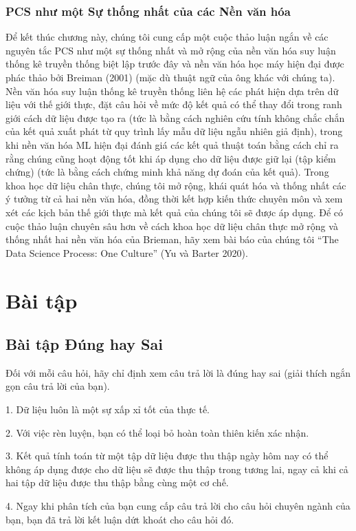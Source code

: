 \subsubsection{PCS như một Sự thống nhất của các Nền văn hóa}
Để kết thúc chương này, chúng tôi cung cấp một cuộc thảo luận ngắn về các nguyên tắc PCS như một sự thống nhất và mở rộng của nền văn hóa suy luận thống kê truyền thống biệt lập trước đây và nền văn hóa học máy hiện đại được phác thảo bởi Breiman (2001) (mặc dù thuật ngữ của ông khác với chúng ta). Nền văn hóa suy luận thống kê truyền thống liên hệ các phát hiện dựa trên dữ liệu với thế giới thực, đặt câu hỏi về mức độ kết quả có thể thay đổi trong ranh giới cách dữ liệu được tạo ra (tức là bằng cách nghiên cứu tính không chắc chắn của kết quả xuất phát từ quy trình lấy mẫu dữ liệu ngẫu nhiên giả định), trong khi nền văn hóa ML hiện đại đánh giá các kết quả thuật toán bằng cách chỉ ra rằng chúng cũng hoạt động tốt khi áp dụng cho dữ liệu được giữ lại (tập kiểm chứng) (tức là bằng cách chứng minh khả năng dự đoán của kết quả). Trong khoa học dữ liệu chân thực, chúng tôi mở rộng, khái quát hóa và thống nhất các ý tưởng từ cả hai nền văn hóa, đồng thời kết hợp kiến thức chuyên môn và xem xét các kịch bản thế giới thực mà kết quả của chúng tôi sẽ được áp dụng. Để có cuộc thảo luận chuyên sâu hơn về cách khoa học dữ liệu chân thực mở rộng và thống nhất hai nền văn hóa của Brieman, hãy xem bài báo của chúng tôi “The Data Science Process: One Culture” (Yu và Barter 2020).

\section*{Bài tập}

\subsection*{Bài tập Đúng hay Sai}
Đối với mỗi câu hỏi, hãy chỉ định xem câu trả lời là đúng hay sai (giải thích ngắn gọn câu trả lời của bạn).

1. Dữ liệu luôn là một sự xấp xỉ tốt của thực tế.

2. Với việc rèn luyện, bạn có thể loại bỏ hoàn toàn thiên kiến xác nhận.

3. Kết quả tính toán từ một tập dữ liệu được thu thập ngày hôm nay có thể không áp dụng được cho dữ liệu sẽ được thu thập trong tương lai, ngay cả khi cả hai tập dữ liệu được thu thập bằng cùng một cơ chế.

4. Ngay khi phân tích của bạn cung cấp câu trả lời cho câu hỏi chuyên ngành của bạn, bạn đã trả lời kết luận dứt khoát cho câu hỏi đó.

